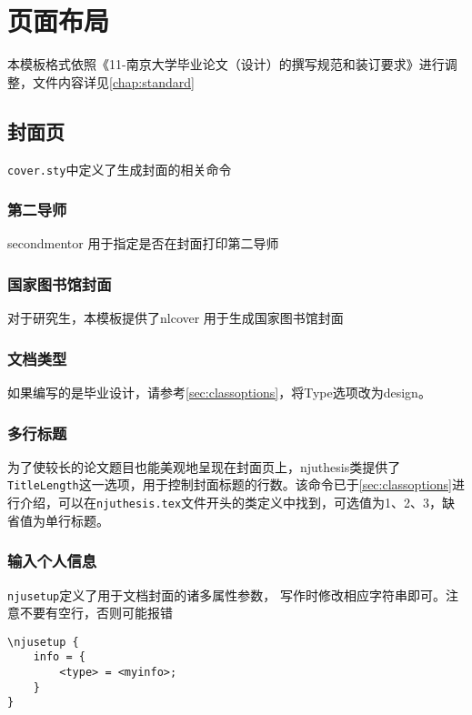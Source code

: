 \chapter{页面布局}

本模板格式依照《11-南京大学毕业论文（设计）的撰写规范和装订要求》进行调整，文件内容详见\cref{chap:standard}

\section{封面页}


\texttt{cover.sty}中定义了生成封面的相关命令


\subsection{第二导师}

secondmentor 用于指定是否在封面打印第二导师

\subsection{国家图书馆封面}

对于研究生，本模板提供了nlcover 用于生成国家图书馆封面

\subsection{文档类型}

如果编写的是毕业设计，请参考\cref{sec:classoptions}，将Type选项改为design。
\subsection{多行标题}

为了使较长的论文题目也能美观地呈现在封面页上，njuthesis类提供了\texttt{TitleLength}这一选项，用于控制封面标题的行数。该命令已于\cref{sec:classoptions}进行介绍，可以在\texttt{njuthesis.tex}文件开头的类定义中找到，可选值为1、2、3，缺省值为单行标题。


\subsection{输入个人信息}

\texttt{njusetup}定义了用于文档封面的诸多属性参数，
写作时修改相应字符串即可。注意不要有空行，否则可能报错

\begin{lstlisting}
\njusetup {
    info = {
        <type> = <myinfo>; 
    }
}
\end{lstlisting}

